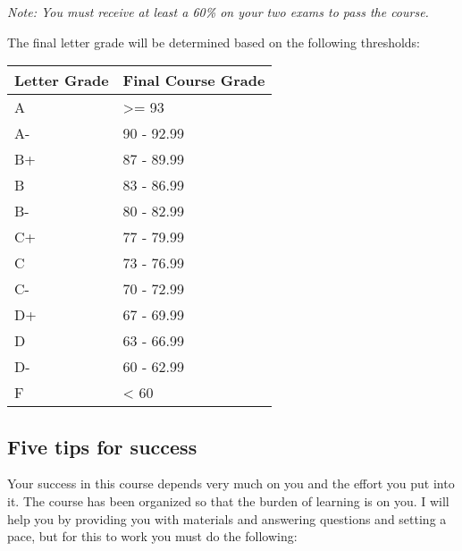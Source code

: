 \documentclass[
  letterpaper,
  DIV=11,
  numbers=noendperiod]{scrartcl}
\begin{document}
\emph{Note: You must receive at least a 60\% on your two exams to pass
the course.}

The final letter grade will be determined based on the following
thresholds:

\begin{longtable}[]{@{}ll@{}}
\toprule\noalign{}
Letter Grade & Final Course Grade \\
\midrule\noalign{}
\endhead
\bottomrule\noalign{}
\endlastfoot
A & \textgreater= 93 \\
A- & 90 - 92.99 \\
B+ & 87 - 89.99 \\
B & 83 - 86.99 \\
B- & 80 - 82.99 \\
C+ & 77 - 79.99 \\
C & 73 - 76.99 \\
C- & 70 - 72.99 \\
D+ & 67 - 69.99 \\
D & 63 - 66.99 \\
D- & 60 - 62.99 \\
F & \textless{} 60 \\
\end{longtable}

\subsection{Five tips for success}\label{five-tips-for-success}

Your success in this course depends very much on you and the effort you
put into it. The course has been organized so that the burden of
learning is on you. I will help you by providing you with materials and
answering questions and setting a pace, but for this to work you must do
the following:
\end{document}

